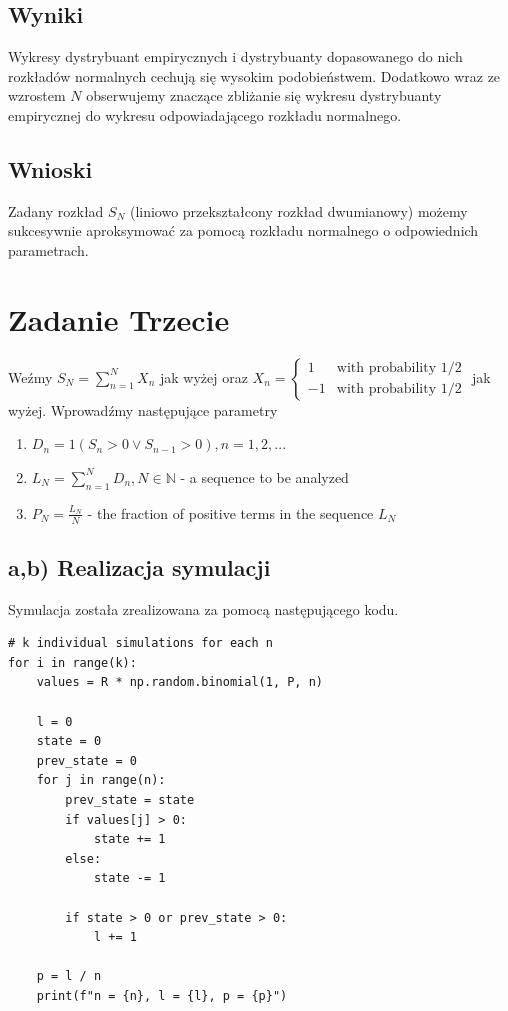 \documentclass{article}
\begin{document}
\subsection{Wyniki}

Wykresy dystrybuant empirycznych i dystrybuanty dopasowanego do nich rozkładów normalnych cechują się wysokim podobieństwem. Dodatkowo wraz ze wzrostem $N$ obserwujemy znaczące zbliżanie się wykresu dystrybuanty empirycznej do wykresu odpowiadającego rozkładu normalnego.

\subsection{Wnioski}

Zadany rozkład $S_N$ (liniowo przekształcony rozkład dwumianowy) możemy sukcesywnie aproksymować za pomocą rozkładu normalnego o odpowiednich parametrach.

\section{Zadanie Trzecie}

Weźmy $S_N = \sum_{n=1}^{N} X_n$ jak wyżej oraz $X_n = \begin{cases} 1 & \text{with probability } 1/2 \\ -1 & \text{with probability } 1/2 \end{cases}$ jak wyżej. Wprowadźmy następujące parametry
\begin{enumerate}
    \item $D_{n} = 1 (S_n > 0 \lor S_{n-1} > 0), n = 1, 2, ...$
    \item $L_{N} = \sum_{n=1}^{N} D_{n}, N \in \mathbb{N}$ - a sequence to be analyzed
    \item $P_{N} = \frac{L_{N}}{N}$ - the fraction of positive terms in the sequence $L_{N}$
\end{enumerate}

\subsection{a,b) Realizacja symulacji}

Symulacja została zrealizowana za pomocą następującego kodu.

\begin{verbatim}
# k individual simulations for each n
for i in range(k):
    values = R * np.random.binomial(1, P, n)

    l = 0
    state = 0
    prev_state = 0
    for j in range(n):
        prev_state = state
        if values[j] > 0:
            state += 1
        else:
            state -= 1

        if state > 0 or prev_state > 0:
            l += 1
        
    p = l / n
    print(f"n = {n}, l = {l}, p = {p}")
\end{verbatim}
\end{document}
